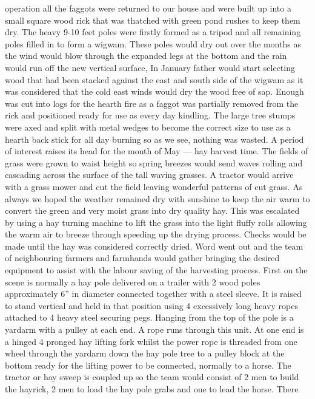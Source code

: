 operation all the faggots were returned to our house and were built up into a
small square wood rick that was thatched with green pond rushes to keep them
dry. The heavy 9-10 feet poles were firstly formed as a tripod and all
remaining poles filled in to form a wigwam. These poles would dry out over the
months as the wind would blow through the expanded legs at the bottom and the
rain would run off the new vertical surface, In January father would start
selecting wood that had been stacked against the east and south side of the
wigwam as it was considered that the cold east winds would dry the wood free of
sap. Enough was cut into logs for the hearth fire as a faggot was partially
removed from the rick and positioned ready for use as every day kindling. The
large tree stumps were axed and split with metal wedges to become the correct
size to use as a hearth back stick for all day burning so as we see, nothing
was wasted. A period of interest raises its head for the month of May --- hay
harvest time. The fields of grass were grown to waist height so spring breezes
would send waves rolling and cascading across the surface of the tall waving
grasses.  A tractor would arrive with a grass mower and cut the field leaving
wonderful patterns of cut grass. As always we hoped the weather remained dry
with sunshine to keep the air warm to convert the green and very moist grass
into dry quality hay. This was escalated by using a hay turning machine to
lift the grass into the light fluffy rolls allowing the warm air to breeze
through speeding up the drying process. Checks would be made until the hay was
considered correctly dried.  Word went out and the team of neighbouring
farmers and farmhands would gather bringing the desired equipment to assist
with the labour saving of the harvesting process. First on the scene is
normally a hay pole delivered on a trailer with 2 wood poles approximately 6''
in diameter connected together with a steel sleeve. It is raised to stand
vertical and held in that position using 4 excessively long heavy ropes
attached to 4 heavy steel securing pegs. Hanging from the top of the pole is a
yardarm with a pulley at each end. A rope runs through this unit.  At one end
is a hinged 4 pronged hay lifting fork whilst the power rope is threaded from
one wheel through the yardarm down the hay pole tree to a pulley block at the
bottom ready for the lifting power to be connected, normally to a horse. The
tractor or hay sweep is coupled up so the team would consist of 2 men to build
the hayrick, 2 men to load the hay pole grabs and one to lead the horse. There
